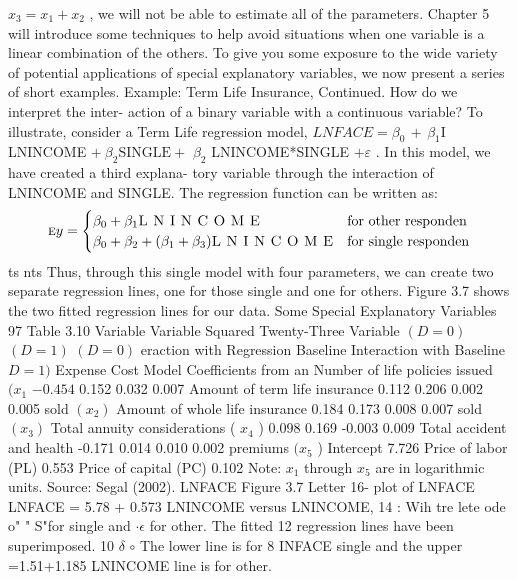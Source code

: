 \documentclass[11pt]{article}
\begin{document}
\(x_{3}=x_{1}+x_{2}\) , we will not be able to estimate all of the parameters. Chapter 5 will
 introduce some techniques to help avoid situations when one variable is a linear
combination of the others.
To give you some exposure to the wide variety of potential applications of
special explanatory variables, we now present a series of short examples.
Example: Term Life Insurance, Continued. How do we interpret the inter-
action of a binary variable with a continuous variable? To illustrate, consider a
Term Life regression model, \(L N F \! A C E=\beta_{0} \,+\, \beta_{1} \mathrm{I}\) LNINCOME \(+ \ \beta_{2} \mathrm{S I N G L E}+\)
\(\beta_{2}\) LNINCOME*SINGLE \(+ \varepsilon\) . In this model, we have created a third explana-
 tory variable through the interaction of LNINCOME and SINGLE. The regression
function can be written as:
\[
\textsc{e} y=\begin{cases} {\beta_{0}+\beta_{1} \textsc{L N I N C O M E}} & {\mathrm{f o r ~ o t h e r ~ r e s p o n d e n}} \\ {\beta_{0}+\beta_{2}+( \beta_{1}+\beta_{3} ) \textsc{L N I N C O M E}} & {\mathrm{f o r ~ s i n g l e ~ r e s p o n d e n}} \\ \end{cases}
\]
ts
nts
Thus, through this single model with four parameters, we can create two separate
regression lines, one for those single and one for others. Figure 3.7 shows the
 two fitted regression lines for our data.
 Some Special Explanatory Variables 97
Table 3.10
Variable Variable Squared Twenty-Three
Variable \(( D=0 )\) \(( D=1 )\) \(( D=0 )\) eraction with Regression
Baseline Interaction with Baseline \(D=1 )\) Expense Cost Model
Coefficients from an
 Number of life policies issued \(( x_{1}\) \(- 0 . 4 5 4\) 0.152 0.032 0.007
 Amount of term life insurance 0.112 0.206 0.002 0.005
sold \(( x_{2} )\)
Amount of whole life insurance 0.184 0.173 0.008 0.007
sold \(( x_{3} )\)
Total annuity considerations ( \(x_{4}\) ) 0.098 0.169 -0.003 0.009
Total accident and health -0.171 0.014 0.010 0.002
premiums \(( x_{5}\) )
Intercept 7.726
Price of labor (PL) 0.553
Price of capital (PC) 0.102
Note: \(x_{1}\) through \(x_{5}\) are in logarithmic units.
Source: Segal (2002).
LNFACE Figure 3.7 Letter
16- plot of LNFACE
LNFACE = 5.78 + 0.573 LNINCOME versus LNINCOME,
14 : Wih tre lete ode o"
" S"for single and \(\cdot\epsilon\)
for other. The fitted
12 regression lines have
been superimposed.
10 \(\delta\) \(\circ\) The lower line is for
8 INFACE single and the upper
=1.51+1.185 LNINCOME line is for other.
\end{document}
